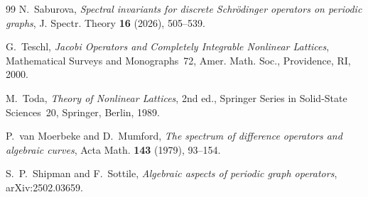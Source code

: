 \documentclass[11pt,reqno]{amsart}
\theoremstyle{definition}
\theoremstyle{remark}
\begin{document}
\begin{thebibliography}{99}
N.~Saburova,
\emph{Spectral invariants for discrete Schr\"odinger operators on periodic
graphs},
J. Spectr. Theory \textbf{16} (2026), 505--539.

G.~Teschl,
\emph{Jacobi Operators and Completely Integrable Nonlinear Lattices},
Mathematical Surveys and Monographs~72, Amer. Math. Soc., Providence, RI, 2000.

M.~Toda,
\emph{Theory of Nonlinear Lattices}, 2nd ed., Springer Series in Solid-State
Sciences~20, Springer, Berlin, 1989.

P.~van Moerbeke and D.~Mumford,
\emph{The spectrum of difference operators and algebraic curves},
Acta Math. \textbf{143} (1979), 93--154.

S.~P.~Shipman and F.~Sottile,
\emph{Algebraic aspects of periodic graph operators},
arXiv:2502.03659.

\end{thebibliography}
\end{document}
